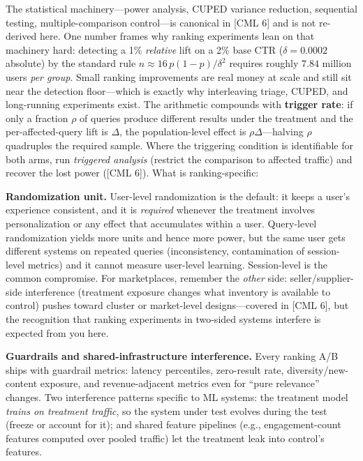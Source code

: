 The statistical machinery---power analysis, CUPED variance reduction, sequential testing, multiple-comparison control---is canonical in [CML 6] and is not re-derived here. One number frames why ranking experiments lean on that machinery hard: detecting a 1\% \textit{relative} lift on a 2\% base CTR ($\delta = 0.0002$ absolute) by the standard rule $n \approx 16\,p(1-p)/\delta^2$ requires roughly $7.84$ million users \textit{per group}. Small ranking improvements are real money at scale and still sit near the detection floor---which is exactly why interleaving triage, CUPED, and long-running experiments exist. The arithmetic compounds with \textbf{trigger rate}: if only a fraction $\rho$ of queries produce different results under the treatment and the per-affected-query lift is $\Delta$, the population-level effect is $\rho\Delta$---halving $\rho$ quadruples the required sample. Where the triggering condition is identifiable for both arms, run \textit{triggered analysis} (restrict the comparison to affected traffic) and recover the lost power ([CML 6]). What is ranking-specific:

\textbf{Randomization unit.} User-level randomization is the default: it keeps a user's experience consistent, and it is \textit{required} whenever the treatment involves personalization or any effect that accumulates within a user. Query-level randomization yields more units and hence more power, but the same user gets different systems on repeated queries (inconsistency, contamination of session-level metrics) and it cannot measure user-level learning. Session-level is the common compromise. For marketplaces, remember the \textit{other} side: seller/supplier-side interference (treatment exposure changes what inventory is available to control) pushes toward cluster or market-level designs---covered in [CML 6], but the recognition that ranking experiments in two-sided systems interfere is expected from you here.

\textbf{Guardrails and shared-infrastructure interference.} Every ranking A/B ships with guardrail metrics: latency percentiles, zero-result rate, diversity/new-content exposure, and revenue-adjacent metrics even for ``pure relevance'' changes. Two interference patterns specific to ML systems: the treatment model \textit{trains on treatment traffic}, so the system under test evolves during the test (freeze or account for it); and shared feature pipelines (e.g., engagement-count features computed over pooled traffic) let the treatment leak into control's features.

